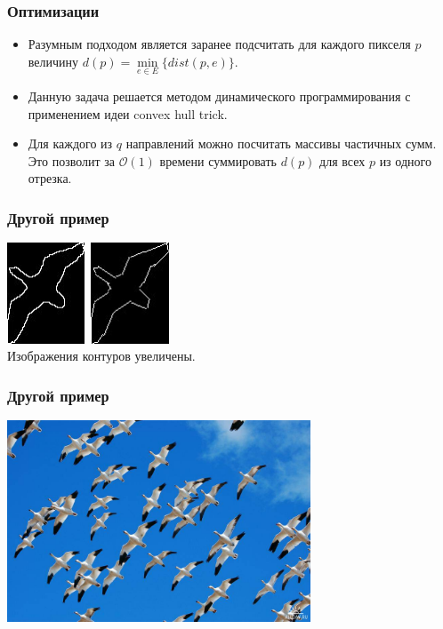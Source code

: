 \begin{frame}\frametitle{Оптимизации}
    \begin{itemize}
        \item Разумным подходом является заранее подсчитать для каждого пикселя
        $p$ величину $d(p) = \min\limits_{e \in E}\{dist(p, e)\}$.
        \pause
        \item Данную задача решается методом динамического программирования с
        применением идеи convex hull trick.
        \pause
        \item Для каждого из $q$ направлений можно посчитать массивы частичных сумм.
        Это позволит за $\mathcal{O}(1)$ времени суммировать $d(p)$ для всех
        $p$ из одного отрезка.
    \end{itemize}
\end{frame}

\begin{frame}\frametitle{Другой пример}
    \begin{center}
        \includegraphics[height=3cm]{veselov_imgs/pattern1.jpg}\
        \includegraphics[height=3cm]{veselov_imgs/l_pttrn1.jpg}\\
        Изображения контуров увеличены.
    \end{center}
\end{frame}

\begin{frame}\frametitle{Другой пример}
    \begin{center}
        \includegraphics[height=6cm]{veselov_imgs/image1.jpg}
    \end{center}
\end{frame}

